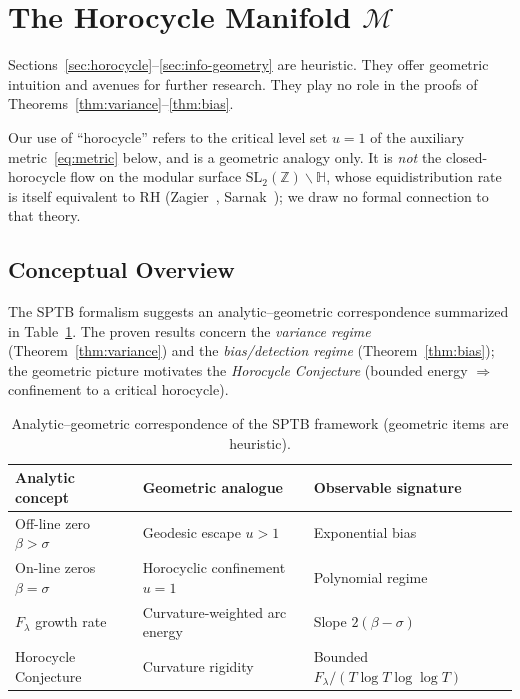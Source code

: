 
\section{The Horocycle Manifold \texorpdfstring{$\mathcal{M}$}{M}}

\begin{remark}[Status]
Sections~\ref{sec:horocycle}–\ref{sec:info-geometry} are heuristic.
They offer geometric intuition and avenues for further research.
They play no role in the proofs of Theorems~\ref{thm:variance}–\ref{thm:bias}.
\end{remark}

\begin{remark}
Our use of ``horocycle'' refers to the critical level set $u=1$ of the
auxiliary metric~\eqref{eq:metric} below, and is a geometric analogy only.
It is \emph{not} the closed-horocycle flow on the modular surface
$\mathrm{SL}_2(\mathbb{Z})\backslash\mathbb{H}$, whose equidistribution rate is
itself equivalent to RH (Zagier~\cite{zagier}, Sarnak~\cite{sarnak-horocycle});
we draw no formal connection to that theory.
\end{remark}

\subsection{Conceptual Overview}

The SPTB formalism suggests an analytic–geometric correspondence summarized in
Table~\ref{tab:roadmap4}.  The proven results concern the
\emph{variance regime} (Theorem~\ref{thm:variance}) and the
\emph{bias/detection regime} (Theorem~\ref{thm:bias}); the geometric picture
motivates the \emph{Horocycle Conjecture}
(bounded energy $\Rightarrow$ confinement to a critical horocycle).

\begin{table}[h]
\centering
\caption{Analytic–geometric correspondence of the SPTB framework (geometric items are heuristic).}
\label{tab:roadmap4}
\begin{tabular}{lll}
\toprule
Analytic concept & Geometric analogue & Observable signature \\
\midrule
Off-line zero $\beta>\sigma$ & Geodesic escape $u>1$ & Exponential bias \\
On-line zeros $\beta=\sigma$ & Horocyclic confinement $u=1$ & Polynomial regime \\
$F_\lambda$ growth rate & Curvature-weighted arc energy & Slope $2(\beta-\sigma)$ \\
Horocycle Conjecture & Curvature rigidity & Bounded $F_\lambda/(T\log T\log\log T)$ \\
\bottomrule
\end{tabular}
\end{table}

